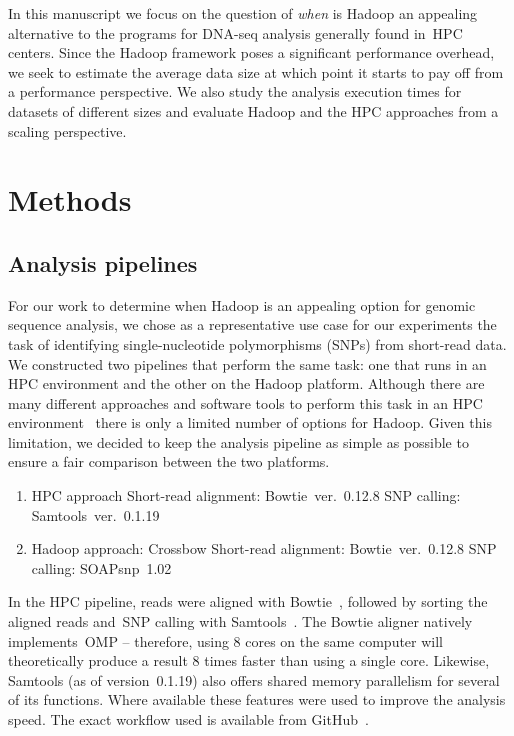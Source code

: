 \documentclass[10pt]{article}
\newcommand{\Fixme}[1]{{\color{FixmeColor}{#1}}}
\begin{document}
In this manuscript we focus on the question of {\it when} is Hadoop an appealing alternative to the programs for DNA-seq analysis generally found in~HPC centers.
Since the Hadoop framework poses a significant performance overhead, we seek to estimate the average data size at which point it starts to pay off from a performance perspective. We also study the analysis execution times for datasets of different sizes and evaluate Hadoop and the HPC approaches from a scaling perspective.


\section*{Methods}


\subsection*{Analysis pipelines}

For our work to determine when Hadoop is an appealing option for genomic
sequence analysis, we chose as a representative 
use case for our experiments the task of identifying
single-nucleotide polymorphisms (SNPs) from short-read data.  We constructed
two pipelines that perform the same task: one that runs in an HPC environment
and the other on the Hadoop platform.  Although there are many different
approaches and software tools to perform this task in an HPC environment~\cite{Li:2013fk} there is only a limited
number of options for Hadoop. Given this limitation, we decided to keep the
analysis pipeline as simple as possible to ensure a fair comparison between the
two platforms.

\begin{enumerate}
\item HPC approach
\subitem Short-read alignment: Bowtie~ver.~0.12.8
\subitem SNP calling: Samtools~ver.~0.1.19
\item Hadoop approach: Crossbow
\subitem Short-read alignment: Bowtie~ver.~0.12.8
\subitem SNP calling: SOAPsnp~1.02
\end{enumerate}


In the HPC pipeline, reads were aligned with Bowtie~\cite{Langmead:2009uq}, followed by sorting the aligned reads and~SNP calling with Samtools~\cite{samtools}. The Bowtie aligner natively implements~OMP -- therefore, using 8 cores on the same computer will theoretically produce a result 8 times faster than using a single core. Likewise, Samtools (as of version~0.1.19) also offers shared memory parallelism for several of its functions. Where available these features were used to improve the analysis speed. The exact workflow used is available from GitHub~\cite{code_repo_bash}.
\end{document}
